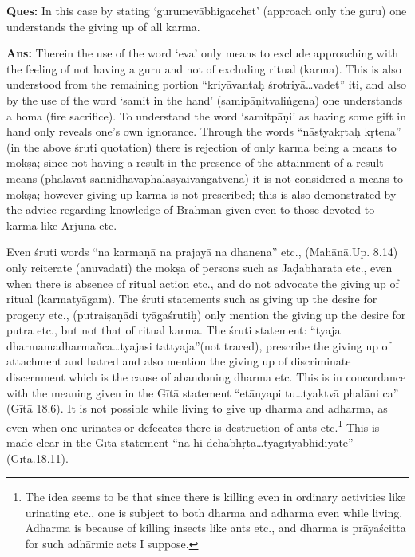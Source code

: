 \textbf{Ques:} In this case by stating ‘gurumevābhigacchet’ (approach only the guru) one understands the giving up of all karma. 

\textbf{Ans:} Therein the use of the word ‘eva’ only means to exclude approaching with the feeling of not having a guru and not of excluding ritual (karma). This is also understood from the remaining portion “kriyāvantaḥ śrotriyā…vadet” iti, and also by the use of the word ‘samit in the hand’ (samipāṇitvaliṅgena) one understands a homa (fire sacrifice). To understand the word ‘samitpāṇi’ as having some gift in hand only reveals one’s own ignorance. Through the words “nāstyakṛtaḥ kṛtena” (in the above śruti quotation) there is rejection of only karma being a means to mokṣa; since not having a result in the presence of the attainment of a result means (phalavat sannidhāvaphalasyaivāṅgatvena) it is not considered a means to mokṣa; however giving up karma is not prescribed; this is also demonstrated by the advice regarding knowledge of Brahman given even to those devoted to karma like Arjuna etc.

Even śruti words “na karmaṇā na prajayā na dhanena” etc., (Mahānā.Up. 8.14) only reiterate (anuvadati)  the mokṣa of persons such as Jaḍabharata etc., even when there is absence of ritual action etc., and do not advocate the giving up of ritual (karmatyāgam). The śruti statements such as giving up the desire for progeny etc., (putraiṣaṇādi tyāgaśrutiḥ) only mention the giving up the desire for putra etc., but not that of ritual karma. The śruti statement: “tyaja dharmamadharmañca…tyajasi tattyaja”(not traced), prescribe the giving up of attachment and hatred and also mention the giving up of discriminate discernment which is the cause of abandoning dharma etc. This is in concordance with the meaning given in the Gītā statement “etānyapi tu…tyaktvā phalāni ca” (Gītā 18.6). It is not possible while living to give up dharma and adharma, as even when one urinates or defecates there is destruction of ants etc.\footnote{The idea seems to be that since there is killing even in ordinary activities like urinating etc., one is subject to both dharma and adharma even while living. Adharma  is because of killing insects like ants etc., and dharma is prāyaścitta for such adhārmic acts I suppose. } This is made clear in the Gītā statement “na hi dehabhṛta…tyāgītyabhidīyate” (Gītā.18.11).


